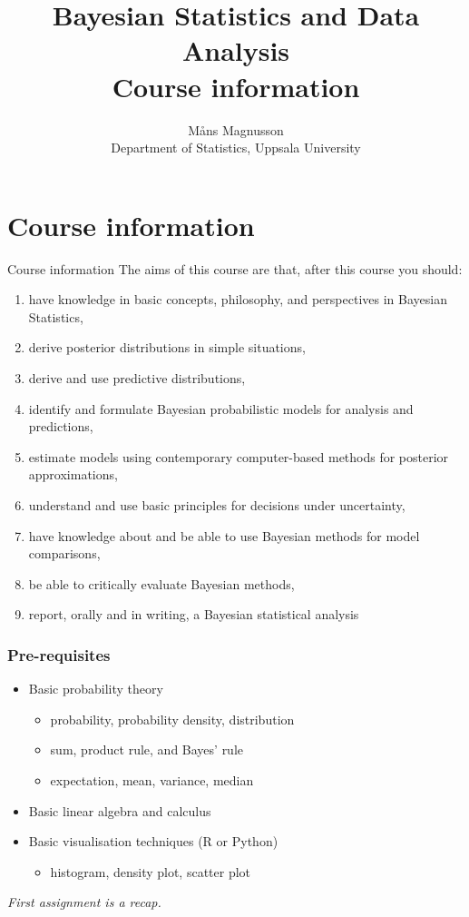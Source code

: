 \documentclass[10pt]{beamer}
\title[]{{\color{black}Bayesian Statistics and Data Analysis \\ Course information}}
\author[]{M{\aa}ns Magnusson \\ Department of Statistics, Uppsala University}
\date{}
\begin{document}
\frame{\titlepage
}



\section{Course information}
\frame{\sectionpage}

\begin{frame}{Course information}
The aims of this course are that, after this course you should:\\[3mm]\pause
\begin{enumerate}
\item have knowledge in basic concepts, philosophy, and perspectives in Bayesian Statistics,
\item derive posterior distributions in simple situations,
\item derive and use predictive distributions,
\item identify and formulate Bayesian probabilistic models for analysis and predictions,
\item estimate models using contemporary computer-based methods for posterior approximations,
\item understand and use basic principles for decisions under uncertainty,
\item have knowledge about and be able to use Bayesian methods for model comparisons,
\item be able to critically evaluate Bayesian methods,
\item report, orally and in writing, a Bayesian statistical analysis
\end{enumerate}

\end{frame}


\begin{frame}
  \frametitle{Pre-requisites}
  \begin{itemize}
  \item Basic probability theory
    \begin{itemize}
    \item probability, probability density, distribution
    \item sum, product rule, and Bayes' rule
    \item expectation, mean, variance, median
  \end{itemize}
  \pause
  \item Basic linear algebra and calculus
  \pause
  \item Basic visualisation techniques (R or Python)
  \begin{itemize}
    \item histogram, density plot, scatter plot
  \end{itemize}
  \end{itemize}
  \pause
  \emph{First assignment is a recap.}

\end{frame}
\end{document}
